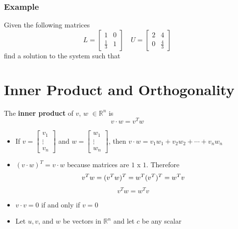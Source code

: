 \subsubsection{Example}
Given the following matrices
\[
  L = \begin{bmatrix}
    1 & 0 \\
    \frac{1}{3} & 1
  \end{bmatrix} \quad 
  U = \begin{bmatrix}
    2 & 4 \\
    0 & \frac{4}{3}
  \end{bmatrix}
\] find a solution to the system such that
\section{Inner Product and Orthogonality}
The \textbf{inner product} of $v$, $w$ $\in \mathbb{R}^n$ is 
\[  
  v \cdot w = v^Tw
\]
\begin{itemize}
  \item If $v = \begin{bmatrix} v_1 \\ \vdots \\ v_n \end{bmatrix}$
and $w = \begin{bmatrix} w_1 \\ \vdots \\ w_n \end{bmatrix}$,
then $v \cdot w = v_1w_1 + v_2w_2 + \cdots + v_nw_n$
\item $(v \cdot w)^T = v \cdot w$ because matrices are $1$ x $1$. Therefore
\[
  v^Tw = (v^Tw)^T = w^T(v^T)^T = w^Tv \\
\]
\[
  v^Tw = w^Tv
\]
\item $v \cdot v = 0$ if and only if $v = 0$
\item Let $u, v$, and $w$ be vectors in $\mathbb{R}^n$ and let $c$ be any scalar
\end{itemize}
